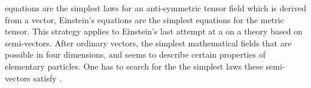 \documentclass[draft]{article}
\begin{document}
equations are the simplest laws for an anti-symmetric tensor field which is derived from a vector, Einstein's equations are the simplest equations for the metric tensor\etc. This strategy applies to Einstein's last attempt at a \uft on a theory based on semi-vectors. After ordinary vectors, the simplest mathematical fields that are possible in four dimensions, and seems to describe certain properties of elementary particles. One has to search for the the simplest laws these semi-vectors satisfy \citep[168]{Einstein1933}.






\end{document}
